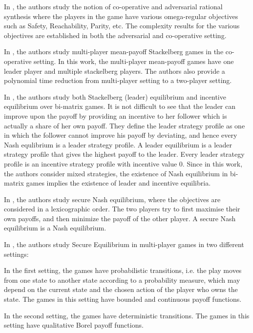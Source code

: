 In \cite{CFGR16}, the authors study the notion of co-operative and adversarial rational synthesis where the players in the game have various omega-regular objectives such as Safety, Reachability, Parity, etc. The complexity results for the various objectives are established in both the adversarial and co-operative setting. 

In \cite{GS14}, the authors study multi-player mean-payoff Stackelberg games in the co-operative setting. In this work, the multi-player mean-payoff games have one leader player and multiple stackelberg players. The authors also provide a polynomial time reduction from multi-player setting to a two-player setting.

In \cite{GS18}, the authors study both Stackelberg (leader) equilibrium and incentive equilibrium over bi-matrix games. It is not difficult to see that the leader can improve upon the payoff by providing an incentive to her follower which is actually a share of her own payoff. They define the leader strategy profile as one in which the follower cannot improve his payoff by deviating, and hence every Nash equlibrium is a leader strategy profile. A leader equilibrium is a leader strategy profile that gives the highest payoff to the leader. Every leader strategy profile is an incentive strategy profile with incentive value $0$. Since in this work, the authors consider mixed strategies, the existence of Nash equilibrium in bi-matrix games \cite{Nash50,LH64} implies the existence of leader and incentive equilibria.

In \cite{CHJ06}, the authors study secure Nash equilibrium, where the objectives are considered in a lexicographic order. The two players try to first maximise their own payoffs, and then minimize the payoff of the other player. A secure Nash equilibrium is a Nash equilibrium. 

In \cite{PFKSV14}, the authors study Secure Equilibrium in multi-player games in two different settings: 
\begin{inparaenum}[(i)]
    \item In the first setting, the games have probabilistic transitions, i.e. the play moves from one state to another state according to a probability measure, which may depend on the current state and the chosen action of the player who owns the state. The games in this setting have bounded and continuous payoff functions.
    \item In the second setting, the games have deterministic transitions. The games in this setting have qualitative Borel payoff functions.
\end{inparaenum}

